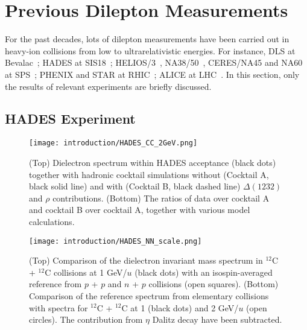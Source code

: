 \section{Previous Dilepton Measurements}
For the past decades, lots of dilepton measurements have been carried out in heavy-ion collisions from low to ultrarelativistic energies. For instance, DLS at Bevalac~\cite{DLS:dielectron0,DLS:dielectron1}; HADES at SIS18~\cite{HADES:dielectron0,HADES:dielectron1,HADES:dielectron2,HADES:dielectron3}; HELIOS/3~\cite{HELIOS:dimuon}, NA38/50~\cite{NA38:dimuon,NA50:dimuon}, CERES/NA45 and NA60 at SPS~\cite{CERES:dielectron0,CERES:dielectron1,CERES:dielectron2,CERES:dielectron3,NA60:dimuon0,NA60:dimuon1,NA60:dimuon2}; PHENIX and STAR at RHIC~\cite{PHENIX:dielectron0,PHENIX:dielectron1,STAR:dielectron0,STAR:dielectron1:PRL,STAR:dielectron1,STAR:dielectron2}; ALICE at LHC~\cite{ALICE:dielectron}. In this section, only the results of relevant experiments are briefly discussed. 

\subsection{HADES Experiment}

\begin{figure}[htbp]
\begin{minipage}[htbp]{0.42\linewidth}
\centering
\texttt{[image: introduction/HADES\_CC\_2GeV.png]}
\caption{(Top) Dielectron spectrum within HADES acceptance (black dots) together with hadronic cocktail simulations without (Cocktail A, black solid line) and with (Cocktail B, black dashed line) $\Delta(1232)$ and $\rho$ contributions. (Bottom) The ratios of data over cocktail A and cocktail B over cocktail A, together with various model calculations. \label{hades_cc2gev}}
\end{minipage}
\hfill
\begin{minipage}[htbp]{0.56\linewidth}
\centering
\texttt{[image: introduction/HADES\_NN\_scale.png]} 
\caption{(Top) Comparison of the dielectron invariant mass spectrum in $^{12}$C + $^{12}$C collisions at 1 GeV/$u$ (black dots) with an isospin-averaged reference from $p$ + $p$ and $n$ + $p$ collisions (open squares). (Bottom) Comparison of the reference spectrum from elementary collisions with spectra for $^{12}$C + $^{12}$C at 1 (black dots) and 2 GeV/$u$ (open circles). The contribution from $\eta$ Dalitz decay have been subtracted.\label{hades_nnscale}}
\end{minipage}
\end{figure}

